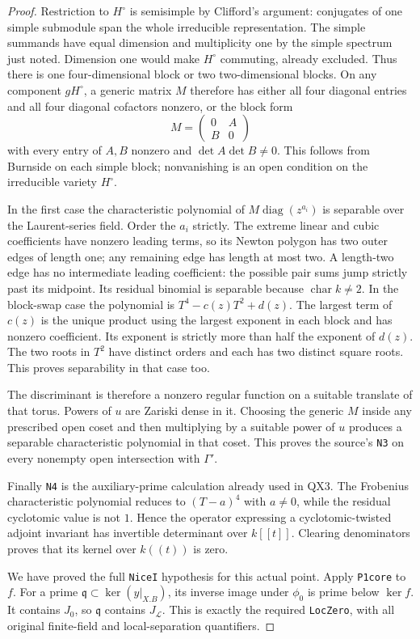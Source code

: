 \begin{proof}
Restriction to $H^\circ$ is semisimple by Clifford's
argument: conjugates of one simple submodule span
the whole irreducible representation.  The simple
summands have equal dimension and multiplicity
one by the simple spectrum just noted.  Dimension
one would make $H^\circ$ commuting, already
excluded.  Thus there is one four-dimensional
block or two two-dimensional blocks.  On any
component $gH^\circ$, a generic matrix $M$ therefore
has either all four diagonal entries and all
four diagonal cofactors nonzero, or the block
form
\[
                  M=\begin{pmatrix}0&A\\ B&0\end{pmatrix}
                  \tag{QX.21}
\]
with every entry of $A,B$ nonzero and
$\det A\det B\ne0$.  This follows from Burnside
on each simple block; nonvanishing is an open
condition on the irreducible variety $H^\circ$.

In the first case the characteristic polynomial of
$M\operatorname{diag}(z^{a_i})$ is separable over
the Laurent-series field.  Order the $a_i$ strictly.
The extreme linear and cubic coefficients have
nonzero leading terms, so its Newton polygon has
two outer edges of length one; any remaining
edge has length at most two.  A length-two edge
has no intermediate leading coefficient: the
possible pair sums jump strictly past its midpoint.
Its residual binomial is separable because
$\operatorname{char}k\ne2$.  In the block-swap
case the polynomial is
$T^4-c(z)T^2+d(z)$.
The largest term of $c(z)$ is the unique product
using the largest exponent in each block and
has nonzero coefficient.  Its exponent is
strictly more than half the exponent of $d(z)$.
The two roots in $T^2$ have distinct orders and
each has two distinct square roots.  This proves
separability in that case too.

The discriminant is therefore a nonzero regular
function on a suitable translate of that torus.
Powers of $u$ are Zariski dense in it.  Choosing
the generic $M$ inside any prescribed open
coset and then multiplying by a suitable power
of $u$ produces a separable characteristic
polynomial in that coset.  This proves the
source's \texttt{N3} on every nonempty open
intersection with $\Gamma'$.

Finally \texttt{N4} is the auxiliary-prime
calculation already used in QX3.  The
Frobenius characteristic polynomial reduces
to $(T-a)^4$ with $a\ne0$, while the residual
cyclotomic value is not $1$.  Hence the
operator expressing a cyclotomic-twisted
adjoint invariant has invertible determinant
over $k[[t]]$.  Clearing denominators proves
that its kernel over $k((t))$ is zero.

We have proved the full \texttt{NiceI} hypothesis
for this actual point.  Apply \texttt{P1core}
to $f$.  For a prime
$\mathfrak q\subset\ker(y|_{X.B})$, its inverse
image under $\phi_0$ is prime below $\ker f$.
It contains $J_0$, so $\mathfrak q$ contains
$J_{\mathcal L}$.  This is exactly the
required \texttt{LocZero}, with all original
finite-field and local-separation quantifiers.
\end{proof}

